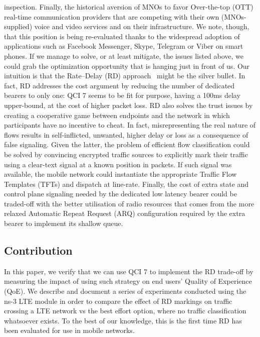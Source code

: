 \documentclass[12pt]{article}
\begin{document}
inspection.  Finally, the historical aversion of MNOs to favor Over-the-top
(OTT) real-time communication providers that are competing with their own
(MNOs-supplied) voice and video services and on their infrastructure. We note,
though, that this position is being re-evaluated thanks to the widespread
adoption of applications such as Facebook Messenger, Skype, Telegram or Viber
on smart phones.  If we manage to solve, or at least mitigate, the issues
listed above, we could grab the optimization opportunity that is hanging just
in front of us. Our intuition is that the Rate–Delay (RD)
approach~\cite{PodlesnyG08, you-tsvwg-latency-loss-tradeoff-00} might be the
silver bullet. In fact, RD addresses the cost argument by reducing the number
of dedicated bearers to only one: QCI 7 seems to be fit for purpose, having a
100ms delay upper-bound, at the cost of higher packet loss. RD also solves the
trust issues by creating a cooperative game between endpoints and the network
in which participants have no incentive to cheat. In fact, misrepresenting the
real nature of flows results in self-inflicted, unwanted, higher delay or loss
as a consequence of false signaling. Given the latter, the problem of efficient
flow classification could be solved by convincing encrypted traffic sources to
explicitly mark their traffic using a clear-text signal at a known position in
packets. If such signal was available, the mobile network could instantiate the
appropriate Traffic Flow Templates (TFTs) and dispatch at line-rate.  Finally,
the cost of extra state and control plane signaling needed by the dedicated low
latency bearer could be traded-off with the better utilisation of radio
resources that comes from the more relaxed Automatic Repeat Request (ARQ)
configuration required by the extra bearer to implement its shallow queue.

\subsection{Contribution}

In this paper, we verify that we can use QCI 7 to implement the RD  trade-off
by measuring the impact of using such strategy on end users' Quality of
Experience (QoE).  We describe and document a series of experiments conducted
using the ns-3  LTE module in order to compare the effect of RD markings on
traffic crossing a LTE network vs the best effort option, where no traffic
classification whatsoever exists. To the best of our knowledge, this is the
first time RD has been evaluated for use in mobile networks.
\end{document}

